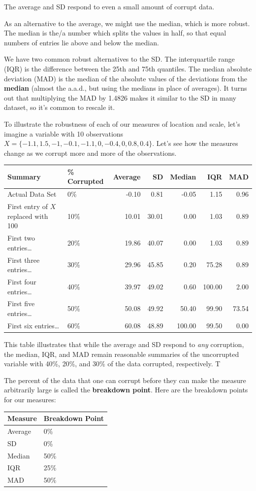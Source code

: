 \documentclass[]{book}
\begin{document}
The average and SD respond to even a small amount of corrupt data.

As an alternative to the average, we might use the median, which is more robust. The median is the/a number which splits the values in half, so that equal numbers of entries lie above and below the median.

We have two common robust alternatives to the SD. The interquartile range (IQR) is the difference between the 25th and 75th quantiles. The median absolute deviation (MAD) is the median of the absolute values of the deviations from the \textbf{median} (almost the a.a.d., but using the medians in place of averages). It turns out that multiplying the MAD by 1.4826 makes it similar to the SD in many dataset, so it's common to rescale it.

To illustrate the robustness of each of our measures of location and scale, let's imagine a variable with 10 observations \(X = \{-1.1, 1.5, -1, -0.1, -1.1, 0, -0.4, 0, 0.8, 0.4\}\). Let's see how the measures change as we corrupt more and more of the observations.

\begin{longtable}[]{@{}llrrrrr@{}}
\toprule
Summary & \% Corrupted & Average & SD & Median & IQR & MAD\tabularnewline
\midrule
\endhead
Actual Data Set & 0\% & -0.10 & 0.81 & -0.05 & 1.15 & 0.96\tabularnewline
First entry of \(X\) replaced with 100 & 10\% & 10.01 & 30.01 & 0.00 & 1.03 & 0.89\tabularnewline
First two entries\ldots{} & 20\% & 19.86 & 40.07 & 0.00 & 1.03 & 0.89\tabularnewline
First three entries\ldots{} & 30\% & 29.96 & 45.85 & 0.20 & 75.28 & 0.89\tabularnewline
First four entries\ldots{} & 40\% & 39.97 & 49.02 & 0.60 & 100.00 & 2.00\tabularnewline
First five entries\ldots{} & 50\% & 50.08 & 49.92 & 50.40 & 99.90 & 73.54\tabularnewline
First six entries\ldots{} & 60\% & 60.08 & 48.89 & 100.00 & 99.50 & 0.00\tabularnewline
\bottomrule
\end{longtable}

This table illustrates that while the average and SD respond to \emph{any} corruption, the median, IQR, and MAD remain reasonable summaries of the uncorrupted variable with 40\%, 20\%, and 30\% of the data corrupted, respectively. T

The percent of the data that one can corrupt before they can make the measure arbitrarily large is called the \textbf{breakdown point}. Here are the breakdown points for our measures:

\begin{longtable}[]{@{}ll@{}}
\toprule
Measure & Breakdown Point\tabularnewline
\midrule
\endhead
Average & 0\%\tabularnewline
SD & 0\%\tabularnewline
Median & 50\%\tabularnewline
IQR & 25\%\tabularnewline
MAD & 50\%\tabularnewline
\bottomrule
\end{longtable}
\end{document}
